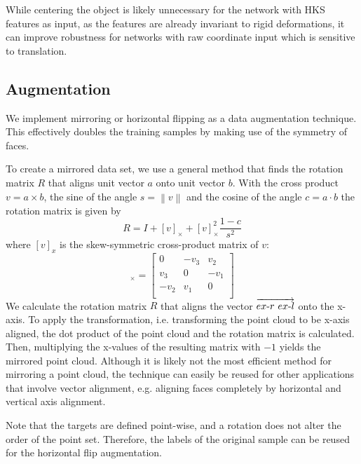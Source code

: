 \documentclass[class=article, crop=false]{standalone}
\newcommand{\norm}[1]{\left\lVert#1\right\rVert}
\begin{document}
While centering the object is likely unnecessary for the network with HKS features as input, as the features are already invariant to rigid deformations, it can improve robustness for networks with raw coordinate input which is sensitive to translation.

\subsection{Augmentation}
We implement mirroring or horizontal flipping as a data augmentation technique. This effectively doubles the training samples by making use of the symmetry of faces.

To create a mirrored data set, we use a general method that finds the rotation matrix $R$ that aligns unit vector $a$ onto unit vector $b$. With the cross product $v = a \times b$, the sine of the angle $s = \norm{v}$ and the cosine of the angle $c = a \cdot b$ the rotation matrix is given by 
\begin{equation}
    R = I + [v]_\times + [v]^2_\times \frac{1-c}{s^2}
\end{equation} where $[v]_x$ is the skew-symmetric cross-product matrix of $v$:
\begin{equation}
    [v]_\times = \begin{bmatrix}
0 & -v_3 & v_2 \\
v_3 & 0 & -v_1 \\
-v_2 & v_1 & 0 \\
\end{bmatrix}
\end{equation}
We calculate the rotation matrix $R$ that aligns the vector $\overrightarrow{ex{\text -}r\text{ }ex{\text -}l}$ onto the x-axis. To apply the transformation, i.e. transforming the point cloud to be x-axis aligned, the dot product of the point cloud and the rotation matrix is calculated. Then, multiplying the x-values of the resulting matrix with $-1$ yields the mirrored point cloud. Although it is likely not the most efficient method for mirroring a point cloud, the technique can easily be reused for other applications that involve vector alignment, e.g. aligning faces completely by horizontal and vertical axis alignment.

Note that the targets are defined point-wise, and a rotation does not alter the order of the point set. Therefore, the labels of the original sample can be reused for the horizontal flip augmentation.
\end{document}
